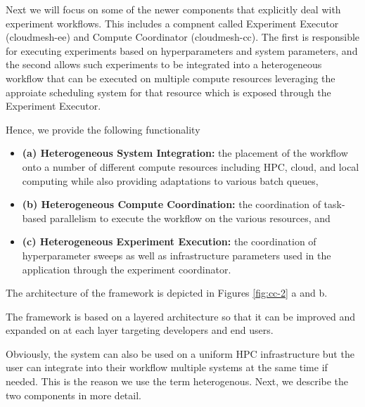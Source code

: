 \documentclass[utf8]{FrontiersinVancouver} %
\begin{document}
Next we will focus on some of the newer components that explicitly deal with experiment workflows. This includes a compnent called Experiment Executor (cloudmesh-ee) and Compute Coordinator (cloudmesh-cc). The first is responsible for executing experiments based on hyperparameters and system parameters, and the second allows such experiments to be integrated into a heterogeneous workflow that can be executed on multiple compute resources leveraging the approiate scheduling system for that resource which is exposed through the Experiment Executor.

Hence, we provide the following functionality 

\begin{itemize}
\item {\bf (a) Heterogeneous System Integration:} the placement
of the workflow onto a number of different compute resources
including HPC, cloud, and local computing while also providing adaptations to various batch queues, 
\item {\bf  (b) Heterogeneous Compute Coordination:} the coordination of task-based parallelism to execute
the workflow on the various resources, and 
\item  {\bf (c) Heterogeneous Experiment
Execution:} the coordination of hyperparameter sweeps as well as infrastructure parameters used
in the application through the experiment coordinator.  

\end{itemize}

The architecture of the framework is depicted in Figures \ref{fig:cc-2} a and b. 

The framework is based on a layered architecture so that
it can be improved and expanded on at each layer targeting
developers and end users.

Obviously, the system can also be used on a uniform HPC infrastructure but the user can integrate into their workflow multiple systems at the same time if needed. This is the reason we use the term heterogenous. Next, we describe the two components in more detail.
\end{document}
